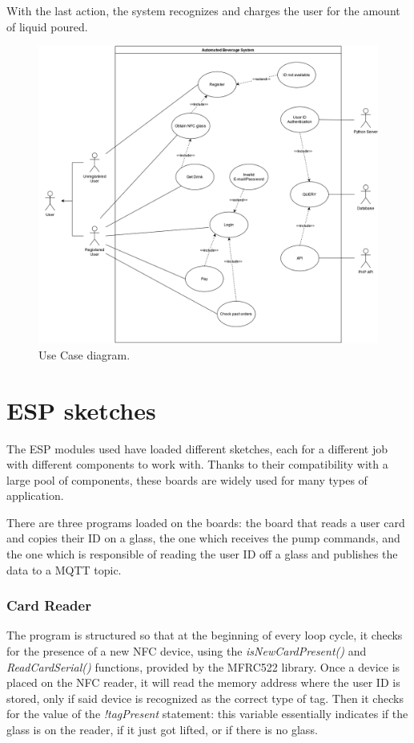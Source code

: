 \documentclass[target=bach,aauheader=,style=]{thud}
\begin{document}
With the last action, the system recognizes and charges the user for the amount of liquid poured.
\newpage
\begin{figure}[h]
	\centering
	\includegraphics[width=1\textwidth]{usecasediagram}
	\caption{Use Case diagram.}
	\label{fig:usecasediagram}
\end{figure} 

\section{ESP sketches}

The ESP modules used have loaded different sketches, each for a different job with different components to work with. Thanks to their compatibility with a large pool of components, these boards are widely used for many types of application.

There are three programs loaded on the boards: the board that reads a user card and copies their ID on a glass, the one which receives the pump commands, and the one which is responsible of reading the user ID off a glass and publishes the data to a MQTT topic.
\newpage
\subsubsection{Card Reader}

The program is structured so that at the beginning of every loop cycle, it checks for the presence of a new NFC device, using the \emph{isNewCardPresent()} and \emph{ReadCardSerial()} functions, provided by the MFRC522 library. Once a device is placed on the NFC reader, it will read the memory address where the user ID is stored, only if said device is recognized as the correct type of tag.
Then it checks for the value of the \emph{!tagPresent} statement: this variable essentially indicates if the glass is on the reader, if it just got lifted, or if there is no glass.
\end{document}
